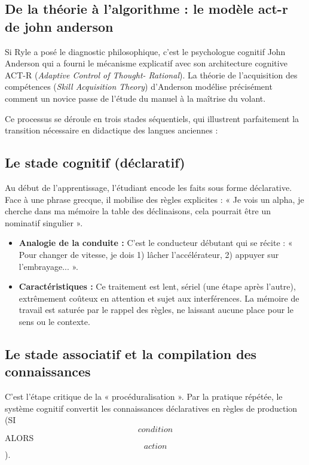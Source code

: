 \subsection{De la théorie à l'algorithme : le modèle act-r de john anderson}

Si Ryle a posé le diagnostic philosophique, c'est le psychologue cognitif John Anderson qui a fourni
le mécanisme explicatif avec son architecture cognitive ACT-R (\textit{Adaptive Control of Thought-
Rational}). La théorie de l'acquisition des compétences (\textit{Skill Acquisition Theory})
d'Anderson modélise précisément comment un novice passe de l'étude du manuel à la maîtrise du
volant.\cite{III-3-3-ref5}

Ce processus se déroule en trois stades séquentiels, qui illustrent parfaitement la transition
nécessaire en didactique des langues anciennes :



\subsection{Le stade cognitif (déclaratif)}

Au début de l'apprentissage, l'étudiant encode les faits sous forme déclarative. Face à une phrase
grecque, il mobilise des règles explicites : « Je vois un alpha, je cherche dans ma mémoire la table
des déclinaisons, cela pourrait être un nominatif singulier ».

\begin{itemize}\item \textbf{Analogie de la conduite :} C'est le conducteur débutant qui se récite : « Pour changer de vitesse, je dois 1) lâcher l'accélérateur, 2) appuyer sur l'embrayage... ».\item \textbf{Caractéristiques :} Ce traitement est lent, sériel (une étape après l'autre), extrêmement coûteux en attention et sujet aux interférences. La mémoire de travail est saturée par le rappel des règles, ne laissant aucune place pour le sens ou le contexte.\cite{III-3-3-ref6}\end{itemize}

\subsection{Le stade associatif et la compilation des connaissances}

C'est l'étape critique de la « procéduralisation ». Par la pratique répétée, le système cognitif
convertit les connaissances déclaratives en règles de production (SI \[condition\] ALORS
\[action\]).

